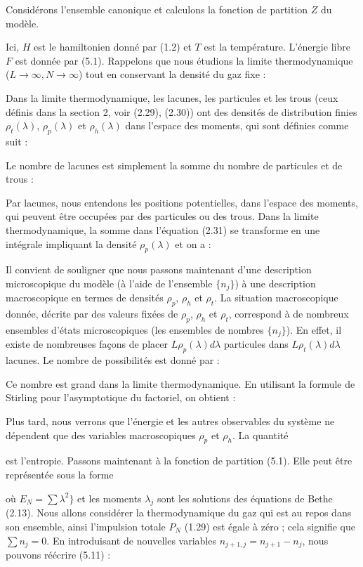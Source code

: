 Considérons l'ensemble canonique et calculons la fonction de partition $Z$ du modèle.

Ici, $H$ est le hamiltonien donné par (1.2) et $T$ est la température.  
L'énergie libre $F$ est donnée par (5.1). Rappelons que nous étudions  
la limite thermodynamique ($L \to \infty, N \to \infty$) tout en conservant  
la densité du gaz fixe :

Dans la limite thermodynamique, les lacunes, les particules et les trous  
(ceux définis dans la section 2, voir (2.29), (2.30)) ont des densités de  
distribution finies $\rho_t(\lambda)$, $\rho_p(\lambda)$ et $\rho_h(\lambda)$  
dans l'espace des moments, qui sont définies comme suit :

Le nombre de lacunes est simplement la somme du nombre de particules  
et de trous :

Par lacunes, nous entendons les positions potentielles, dans l'espace des moments,  
qui peuvent être occupées par des particules ou des trous. Dans la limite thermodynamique,  
la somme dans l'équation (2.31) se transforme en une intégrale impliquant la densité $\rho_p(\lambda)$  
et on a :

Il convient de souligner que nous passons maintenant d'une description microscopique  
du modèle (à l'aide de l'ensemble $\{n_j\}$) à une description macroscopique  
en termes de densités $\rho_p$, $\rho_h$ et $\rho_t$.  
La situation macroscopique donnée, décrite par des valeurs fixées de $\rho_p$, $\rho_h$ et $\rho_t$,  
correspond à de nombreux ensembles d'états microscopiques (les ensembles de nombres $\{n_j\}$).  
En effet, il existe de nombreuses façons de placer $L \rho_p(\lambda) d\lambda$ particules  
dans $L \rho_t(\lambda) d\lambda$ lacunes. Le nombre de possibilités est donné par :

Ce nombre est grand dans la limite thermodynamique.  
En utilisant la formule de Stirling pour l'asymptotique du factoriel, on obtient :

Plus tard, nous verrons que l'énergie et les autres observables du système 
ne dépendent que des variables macroscopiques \( \rho_p \) et \( \rho_h \). La quantité

est l'entropie. Passons maintenant à la fonction de partition (5.1). Elle peut être 
représentée sous la forme

où \( E_N = \sum \lambda^2 \} \) et les moments \( \lambda_j \) sont les solutions des équations de Bethe (2.13). 
Nous allons considérer la thermodynamique du gaz qui est au repos dans son ensemble, 
ainsi l'impulsion totale \( P_N \) (1.29) est égale à zéro ; cela signifie que \( \sum n_j = 0 \). 
En introduisant de nouvelles variables \( n_{j+1 , j} = n_{j+1} - n_j \), nous pouvons réécrire (5.11) :

